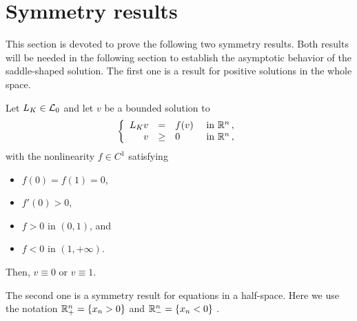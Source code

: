 \section{Symmetry results}
\label{Sec:SymmetryResults}




This section is devoted to prove the following two symmetry results. Both results will be needed in
the following section to establish the asymptotic behavior of the saddle-shaped solution. The first
one is a result for positive solutions in the whole space.

\begin{theorem}
	\label{Th:SymmetryWholeSpace}
	Let $L_K \in \mathcal{L}_0$ and let $v$ be a bounded solution to
	\begin{equation}
	\label{Eq:PositiveWholeSpace}
	\left\{\begin{array}{rcll}
	L_K v &=& f(v) & \textrm{ in }\mathbb{R}^n\,,\\
	v &\geq& 0 & \textrm{ in } \mathbb{R}^n\,,
	\end{array} \right.
	\end{equation}
	with the nonlinearity $f\in C^1$ satisfying
	\begin{itemize}
		\item $f(0) = f(1) = 0$,
		\item $f'(0)>0$,
		\item $f>0$ in $(0,1)$, and
		\item $f<0$ in $(1,+\infty)$.
	\end{itemize}
	Then, $v\equiv 0$ or $v \equiv 1$.
\end{theorem}

The second one is a symmetry result for equations in a half-space. Here we use the notation $\mathbb{R}^n_+
= \{x_n > 0\}$ and $\mathbb{R}^n_- = \{x_n < 0\}$ .

